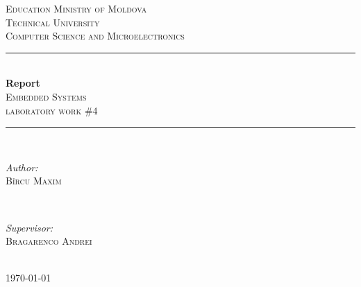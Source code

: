 \begin{titlepage}
\newcommand{\HRule}{\rule{\linewidth}{0.5mm}} 
\center
 

\textsc{\LARGE Education Ministry of Moldova}\\[1.5cm] 
\textsc{\Large Technical University}\\[0.5cm] 
\textsc{\large Computer Science and Microelectronics}\\[0.5cm]


\HRule \\[0.4cm]
{ \Huge \bfseries Report}\\[0.4cm]
\textsc{\large Embedded Systems}\\[0.5cm]
\textsc{ 
laboratory work \#4}\\[0.5cm]
\HRule \\[1.5cm]
 

\begin{minipage}{0.4\textwidth}
\begin{flushleft} \large
\emph{Author:}\\
\textsc{Bîrcu Maxim} %
\end{flushleft}
\end{minipage}
~
\begin{minipage}{0.4\textwidth}
\begin{flushright} \large
\emph{Supervisor:} \\
\textsc{Bragarenco Andrei} %
\end{flushright}
\end{minipage}\\[2cm]


\vfill
{\large \today}\\[2cm] %
\clearpage
 
\end{titlepage}